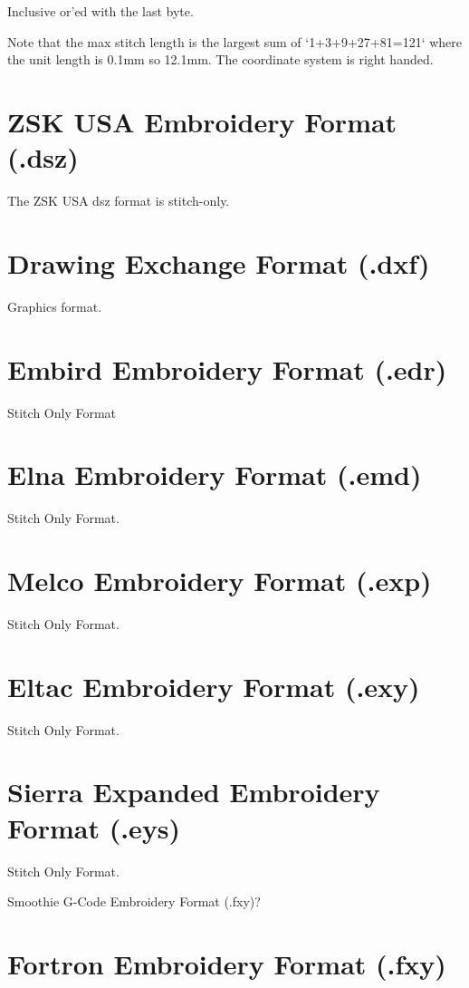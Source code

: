 \documentclass{report}
\begin{document}
Inclusive or'ed with the last byte.

Note that the max stitch length is the largest sum of `1+3+9+27+81=121` where the unit length is 0.1mm so 12.1mm. The coordinate system is right handed.

\section{ZSK USA Embroidery Format (.dsz)}

The ZSK USA dsz format is stitch-only.

\section{Drawing Exchange Format (.dxf)}

Graphics format.

\section{Embird Embroidery Format (.edr)}

Stitch Only Format

\section{Elna Embroidery Format (.emd)}

Stitch Only Format.

\section{Melco Embroidery Format (.exp)}

Stitch Only Format.

\section{Eltac Embroidery Format (.exy)}

Stitch Only Format.

\section{Sierra Expanded Embroidery Format (.eys)}

Stitch Only Format.

Smoothie G-Code Embroidery Format (.fxy)?

\section{Fortron Embroidery Format (.fxy)}
\end{document}
